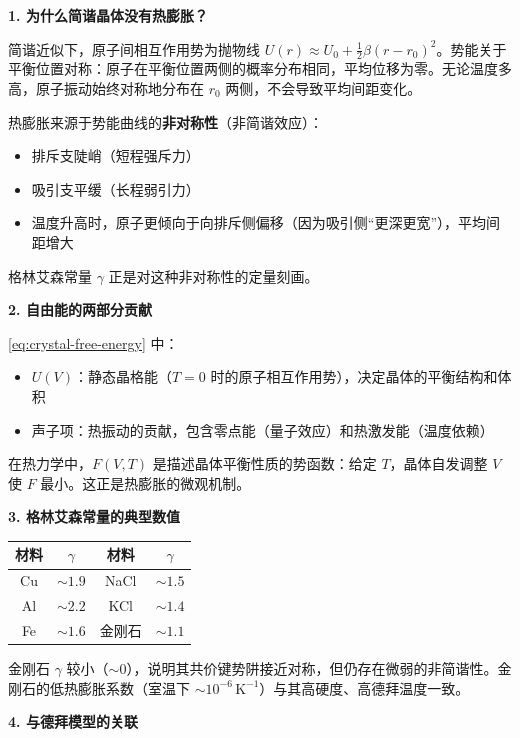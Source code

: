 \begin{insightbox}[物理图像与概念深化]
\textbf{1. 为什么简谐晶体没有热膨胀？}

简谐近似下，原子间相互作用势为抛物线 $U(r)\approx U_0+\tfrac{1}{2}\beta(r-r_0)^2$。势能关于平衡位置对称：原子在平衡位置两侧的概率分布相同，平均位移为零。无论温度多高，原子振动始终对称地分布在 $r_0$ 两侧，不会导致平均间距变化。

热膨胀来源于势能曲线的\textbf{非对称性}（非简谐效应）：
\begin{itemize}
    \item 排斥支陡峭（短程强斥力）
    \item 吸引支平缓（长程弱引力）
    \item 温度升高时，原子更倾向于向排斥侧偏移（因为吸引侧``更深更宽''），平均间距增大
\end{itemize}

格林艾森常量 $\gamma$ 正是对这种非对称性的定量刻画。

\textbf{2. 自由能的两部分贡献}

\eqref{eq:crystal-free-energy} 中：
\begin{itemize}
    \item $U(V)$：静态晶格能（$T=0$ 时的原子相互作用势），决定晶体的平衡结构和体积
    \item 声子项：热振动的贡献，包含零点能（量子效应）和热激发能（温度依赖）
\end{itemize}

在热力学中，$F(V,T)$ 是描述晶体平衡性质的势函数：给定 $T$，晶体自发调整 $V$ 使 $F$ 最小。这正是热膨胀的微观机制。

\textbf{3. 格林艾森常量的典型数值}

\begin{center}
\begin{tabular}{cccc}
\toprule
材料 & $\gamma$ & 材料 & $\gamma$ \\
\midrule
Cu & $\sim1.9$ & NaCl & $\sim1.5$ \\
Al & $\sim2.2$ & KCl & $\sim1.4$ \\
Fe & $\sim1.6$ & 金刚石 & $\sim1.1$ \\
\bottomrule
\end{tabular}
\end{center}

金刚石 $\gamma$ 较小（$\sim0$），说明其共价键势阱接近对称，但仍存在微弱的非简谐性。金刚石的低热膨胀系数（室温下 $\sim10^{-6}\,\mathrm{K^{-1}}$）与其高硬度、高德拜温度一致。

\textbf{4. 与德拜模型的关联}


\end{insightbox}
